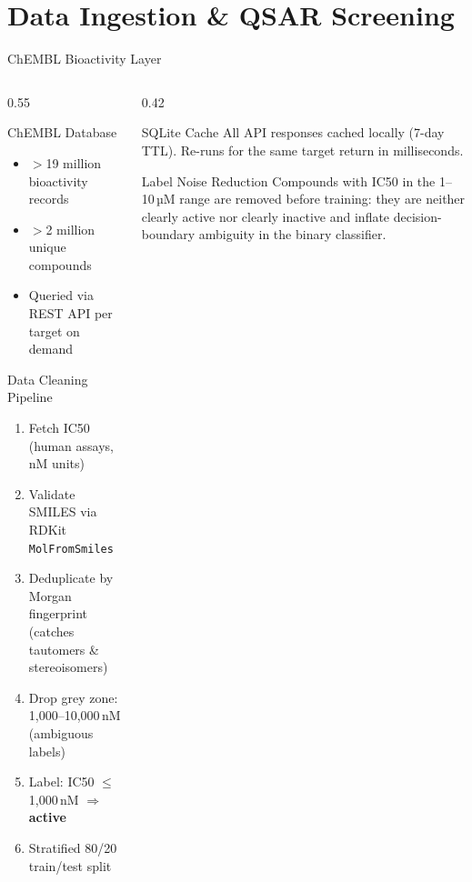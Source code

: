 \section{Data Ingestion \& QSAR Screening}

\begin{frame}{ChEMBL Bioactivity Layer}
  \begin{columns}[T]
    \begin{column}{0.55\textwidth}
      \begin{block}{ChEMBL Database}
        \begin{itemize}
          \item $>$19 million bioactivity records
          \item $>$2 million unique compounds
          \item Queried via REST API per target on demand
        \end{itemize}
      \end{block}
      \vspace{0.3cm}
      \begin{block}{Data Cleaning Pipeline}
        \begin{enumerate}
          \item Fetch IC50 (human assays, nM units)
          \item Validate SMILES via RDKit \texttt{MolFromSmiles}
          \item Deduplicate by Morgan fingerprint (catches tautomers \& stereoisomers)
          \item Drop grey zone: 1{,}000–10{,}000\,nM (ambiguous labels)
          \item Label: IC50 $\leq$ 1{,}000\,nM $\Rightarrow$ \textbf{active}
          \item Stratified 80/20 train/test split
        \end{enumerate}
      \end{block}
    \end{column}
    \begin{column}{0.42\textwidth}
      \begin{exampleblock}{SQLite Cache}
        All API responses cached locally (7-day TTL).
        Re-runs for the same target return in milliseconds.
      \end{exampleblock}
      \vspace{0.3cm}
      \begin{alertblock}{Label Noise Reduction}
        Compounds with IC50 in the 1–10\,µM range are
        removed before training: they are neither clearly
        active nor clearly inactive and inflate decision-
        boundary ambiguity in the binary classifier.
      \end{alertblock}
    \end{column}
  \end{columns}
\end{frame}

